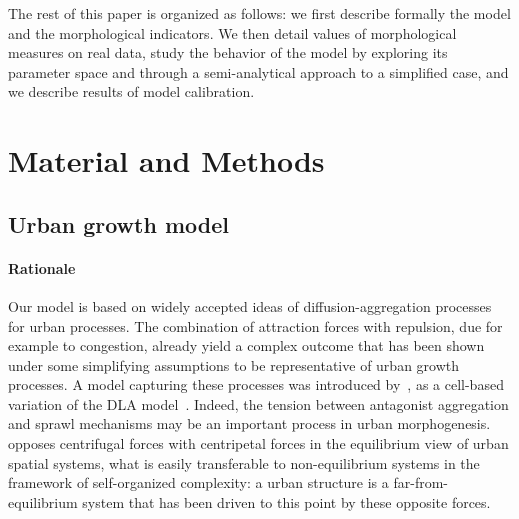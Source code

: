 \documentclass[10pt,letterpaper]{article}
\begin{document}
The rest of this paper is organized as follows: we first describe formally the model and the morphological indicators. We then detail values of morphological measures on real data, study the behavior of the model by exploring its parameter space and through a semi-analytical approach to a simplified case, and we  describe results of model calibration.


\section*{Material and Methods}


\subsection*{Urban growth model}



\paragraph*{Rationale}


Our model is based on widely accepted ideas of diffusion-aggregation processes for urban processes. The combination of attraction forces with repulsion, due for example to congestion, already yield a complex outcome that has been shown under some simplifying assumptions to be representative of urban growth processes. A model capturing these processes was introduced by~\cite{batty2006hierarchy}, as a cell-based variation of the DLA model~\cite{batty1991generating}. Indeed, the tension between antagonist aggregation and sprawl mechanisms may be an important process in urban morphogenesis.  \cite{fujita1996economics} opposes centrifugal forces with centripetal forces in the equilibrium view of urban spatial systems, what is easily transferable to non-equilibrium systems in the framework of self-organized complexity: a urban structure is a far-from-equilibrium system that has been driven to this point by these opposite forces. 
\end{document}
